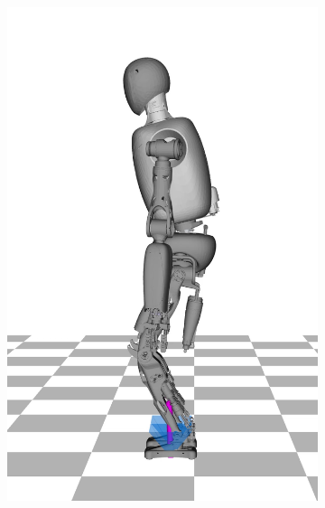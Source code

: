 \begin{figure}
\begin{subfigure}{.16\textwidth}
	\includegraphics[width=.95\linewidth]{fig/jumpVertical/snaps/1x}
	\caption{}
	\end{subfigure}%
\begin{subfigure}{.16\textwidth}

\end{subfigure}
\end{figure}
